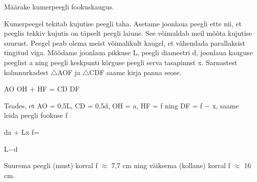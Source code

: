 
Määrake kumerpeegli fookuskaugus.

\hint

\solu
Kumerpeegel tekitab kujutise peegli taha. Asetame joonlaua peegli ette nii, et peeglis tekkiv kujutis on täpselt peegli laiune. See võimaldab meil mõõta kujutise suurust. Peegel peab olema meist võimalikult kaugel, et vähendada parallaksist tingitud viga. Mõõdame joonlaua pikkuse L, peegli diameetri d, joonlaua kauguse peeglist a ning peegli keskpunti kõrguse peegli serva tasapinnst x. Sarnastest kolmnurkadest $\triangle$AOF ja $\triangle$CDF saame kirja panna seose.

AO OH + HF = CD DF

Teades, et AO = 0,5L, CD = 0,5d, OH = a, HF = f ning DF = f $-$ x, saame leida peegli fookuse f

da + Lx f=

L$-$d

Suurema peegli (must) korral f $\approx$ 7,7 cm ning väiksema (kollane) korral f $\approx$ 16 cm.
\probend
